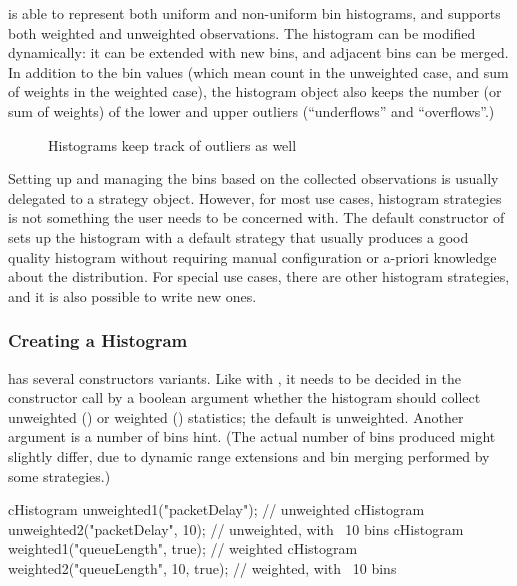  is able to represent both uniform and non-uniform
bin histograms, and supports both weighted and unweighted observations.
The histogram can be modified dynamically: it can be extended with new bins,
and adjacent bins can be merged. In addition to the bin values (which mean
count in the unweighted case, and sum of weights in the weighted case),
the histogram object also keeps the number (or sum of weights) of the
lower and upper outliers (``underflows'' and ``overflows''.)

\begin{figure}[htbp]
  \begin{center}
    
    \caption{Histograms keep track of outliers as well}
  \end{center}
\end{figure}

Setting up and managing the bins based on the collected observations
is usually delegated to a strategy object. However, for most
use cases, histogram strategies is not something the user needs
to be concerned with. The default constructor of 
sets up the histogram with a default strategy that usually produces
a good quality histogram without requiring manual configuration or a-priori
knowledge about the distribution. For special use cases, there are
other histogram strategies, and it is also possible to write new ones.

\subsubsection{Creating a Histogram}
\label{sec:sim-lib:creating-a-histogram}

 has several constructors variants. Like with
, it needs to be decided in the constructor call
by a boolean argument whether the histogram should collect
unweighted () or weighted () statistics;
the default is unweighted. Another argument is a number of bins
hint. (The actual number of bins produced might slightly differ,
due to dynamic range extensions and bin merging performed by
some strategies.)

\begin{cpp}
cHistogram unweighted1("packetDelay");  // unweighted
cHistogram unweighted2("packetDelay", 10);  // unweighted, with ~10 bins
cHistogram weighted1("queueLength", true); // weighted
cHistogram weighted2("queueLength", 10, true); // weighted, with ~10 bins
\end{cpp}

